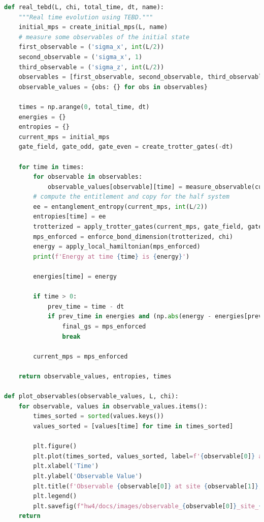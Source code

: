 \documentclass[12pt]{article}
\begin{document}
\begin{lstlisting}[language=Python]
def real_tebd(L, chi, total_time, dt, name):
    """Real time evolution using TEBD."""
    initial_mps = create_initial_mps(L, name)
    # measure some observables of the initial state
    first_observable = ('sigma_x', int(L/2))
    second_observable = ('sigma_x', 1)
    third_observable = ('sigma_z', int(L/2))
    observables = [first_observable, second_observable, third_observable]
    observable_values = {obs: {} for obs in observables}

    times = np.arange(0, total_time, dt)
    energies = {}
    entropies = {}
    current_mps = initial_mps
    gate_field, gate_odd, gate_even = create_trotter_gates(-dt)

    for time in times:
        for observable in observables:
            observable_values[observable][time] = measure_observable(current_mps, observable[0], observable[1])
        # compute the entitlement and copy for the half system
        ee = entanglement_entropy(current_mps, int(L/2))
        entropies[time] = ee
        trotterized = apply_trotter_gates(current_mps, gate_field, gate_odd, gate_even)
        mps_enforced = enforce_bond_dimension(trotterized, chi)
        energy = apply_local_hamiltonian(mps_enforced)
        print(f'Energy at time {time} is {energy}')

        energies[time] = energy

        if time > 0:
            prev_time = time - dt
            if prev_time in energies and (np.abs(energy - energies[prev_time]) / np.abs(energy)) < 1e-8:
                final_gs = mps_enforced
                break

        current_mps = mps_enforced

    return observable_values, entropies, times

def plot_observables(observable_values, L, chi):
    for observable, values in observable_values.items():
        times_sorted = sorted(values.keys())
        values_sorted = [values[time] for time in times_sorted]
        
        plt.figure()
        plt.plot(times_sorted, values_sorted, label=f'{observable[0]} at site {observable[1]}')
        plt.xlabel('Time')
        plt.ylabel('Observable Value')
        plt.title(f'Observable {observable[0]} at site {observable[1]}, L={L}, chi={chi}')
        plt.legend()
        plt.savefig(f"hw4/docs/images/observable_{observable[0]}_site_{observable[1]}_L_{L}_chi_{chi}.png")
    return
\end{lstlisting}
\end{document}
